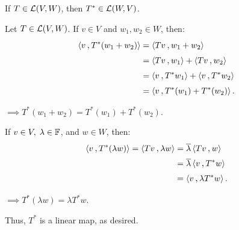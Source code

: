 \begin{thm}
  If $T \in \mathcal{L} (V,W)$, then $T^{*} \in \mathcal{L}(W,V)$.
\end{thm}
\begin{prf}
  Let $T \in \mathcal{L}(V,W)$. If $v \in V$ and $w_1, w_2 \in W$, then:
  \[
    \begin{aligned}
      \ip{v}{T^{*}(w_1 + w_2)}
      &= \ip{Tv}{w_1 + w_2} \\
      &= \ip{Tv}{w_1} + \ip{Tv}{w_2}\\
      &= \ip{v}{T^*w_1}+\ip{v}{T^*w_2}\\
      &= \ip{v}{T^*(w_1) + T^*(w_2)}.
    \end{aligned}
  \]

  $\implies T^*(w_1 + w_2) = T^*(w_1) + T^*(w_2)$.

  If $v \in V, \; \lambda \in \mathbb{F}$, and $w\in W$, then:
  \[
    \begin{aligned}
      \ip{v}{T^*(\lambda w)} = \ip{Tv}{\lambda w}
      & = \overline  \lambda  \ip{Tv}{w}\\
      & = \overline \lambda \ip{v}{T^* w}\\
      & = \ip{v}{\lambda T^* w}.
    \end{aligned}
  \]

  $\implies T^* (\lambda w) = \lambda T^* w.$

  Thus, $T^*$ is a linear map, as desired.
\end{prf}


